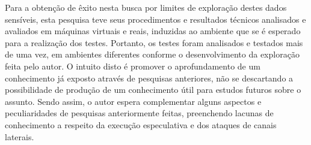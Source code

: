 \documentclass[
	article,			    %
	12pt,				    %
	oneside,			    %
	a4paper,			    %
	chapter=TITLE,		    %
	section=TITLE,		    %
	subsection=TITLE,	    %
	english,			    %
	brazil,				    %
	sumario=tradicional
]{abntex2}
\begin{document}
\begin{comment}
\subsection{Objetivos}
Em razão dos fatos supramencionados, esta pesquisa visa esclarecer, explicar e aplicar métodos desenvolvidos pelos autores citados anteriormente para expor informações de forma genérica (em \emph{softwares} comuns) em computadores pessoais. Assim, o \textbf{objetivo geral} desta pesquisa é demonstrar como a execução especulativa pode ocorrer em \emph{softwares} cujo o fluxo condicional e estrutura de memória se desconhece.

Para alcançar este \textbf{objetivo geral}, os seguintes \textbf{objetivos específicos} foram levantados: 
\begin{enumerate}
    \item \label{o1} Demonstrar e explorar a falha de execução especulativa em fluxos condicionais conhecidos;
    \item \label{o2} Demonstrar e explorar a falha de execução especulativa em fluxos condicionais desconhecidos;
    \item \label{o3} Demonstrar e explorar a falha de execução especulativa em regiões de memória cujos endereços não são conhecidos inicialmente.
\end{enumerate}
\end{comment}
Para a obtenção de êxito nesta busca por limites de exploração destes dados sensíveis, esta pesquisa teve seus procedimentos e resultados técnicos analisados e avaliados em máquinas virtuais e reais, induzidas ao ambiente que se é esperado para a realização dos testes. Portanto, os testes foram analisados e testados mais de uma vez, em ambientes diferentes conforme o desenvolvimento da exploração feita pelo autor. O intuito disto é promover o aprofundamento de um conhecimento já exposto através de pesquisas anteriores, não se descartando a possibilidade de produção de um conhecimento útil para estudos futuros sobre o assunto. Sendo assim, o autor espera complementar alguns aspectos e peculiaridades de pesquisas anteriormente feitas, preenchendo lacunas de conhecimento a respeito da execução especulativa e dos ataques de canais laterais.
\end{document}

